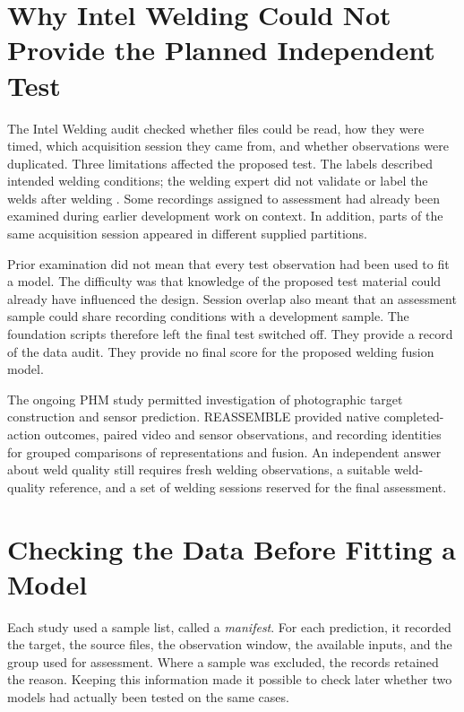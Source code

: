 \section{Why Intel Welding Could Not Provide the Planned Independent Test}
\label{sec:ch4-welding}

The Intel Welding audit checked whether files could be read, how they were timed, which
acquisition session they came from, and whether observations were duplicated. Three
limitations affected the proposed test. The labels described intended welding conditions;
the welding expert did not validate or label the welds after welding
\parencite{Stemmer2024Welding,IntelWeldingHF2024}. Some recordings assigned to assessment had already
been examined during earlier development work on context. In addition, parts of the same
acquisition session appeared in different supplied partitions.

Prior examination did not mean that every test observation had been used to fit a model.
The difficulty was that knowledge of the proposed test material could already have
influenced the design. Session overlap also meant that an assessment sample could share
recording conditions with a development sample. The foundation scripts therefore left
the final test switched off. They provide a record of the data audit. They provide no
final score for the proposed welding fusion model.

The ongoing PHM study permitted investigation of photographic target construction and
sensor prediction. REASSEMBLE provided native completed-action outcomes, paired video
and sensor observations, and recording identities for grouped comparisons of
representations and fusion. An independent answer about
weld quality still requires fresh welding observations, a suitable weld-quality
reference, and a set of welding sessions reserved for the final assessment.


\section{Checking the Data Before Fitting a Model}
\label{sec:ch4-admission}

Each study used a sample list, called a \emph{manifest}. For each prediction, it
recorded the target, the source files, the observation window, the available inputs, and
the group used for assessment. Where a sample was excluded, the records retained the
reason. Keeping this information made it possible to check later whether two models had
actually been tested on the same cases.

